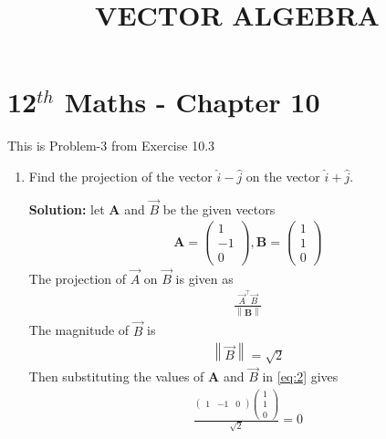 \documentclass[12pt]{article}
\providecommand{\norm}[1]{\left\lVert#1\right\rVert}
\newcommand{\solution}{\noindent \textbf{Solution: }}
\newcommand{\myvec}[1]{\ensuremath{\begin{pmatrix}#1\end{pmatrix}}}
\let\vec\mathbf
\begin{document}
\begin{center}
\enlargethispage{-4cm}
\title{\textbf{VECTOR ALGEBRA}}
\date{\vspace{-5ex}} %
\maketitle
\end{center}
\setcounter{page}{1}
\section*{12$^{th}$ Maths - Chapter 10}
This is Problem-3 from Exercise 10.3
\begin{enumerate}
\item Find the projection of the vector $\hat{i}-\hat{j}$ on the vector $\hat{i}+\hat{j}$.

\solution let $\vec{A}$ and $\Vec{B}$ be the given vectors
\begin{align}
 \vec{A} =\myvec{1\\-1\\0},\vec{B} =\myvec{1\\1\\0}
\end{align}
The projection of $\Vec{A}$ on $\Vec{B}$ is given as
\begin{align}
  \frac{\Vec{A}^\top \Vec{B}}{\norm{\vec{B}}}\label{eq:2}
\end{align}
The magnitude of $\Vec{B}$ is 
\begin{align}
   \norm{\Vec{B}}=\sqrt{2} 
\end{align}
Then substituting the values of $\vec{A}$ and $\Vec{B}$ in \eqref{eq:2} gives
 \begin{align}
\frac{\myvec{1 & -1 & 0}\myvec{1\\1\\0}}{\sqrt{2}}=0
 \end{align}
\end{enumerate}
\end{document}
